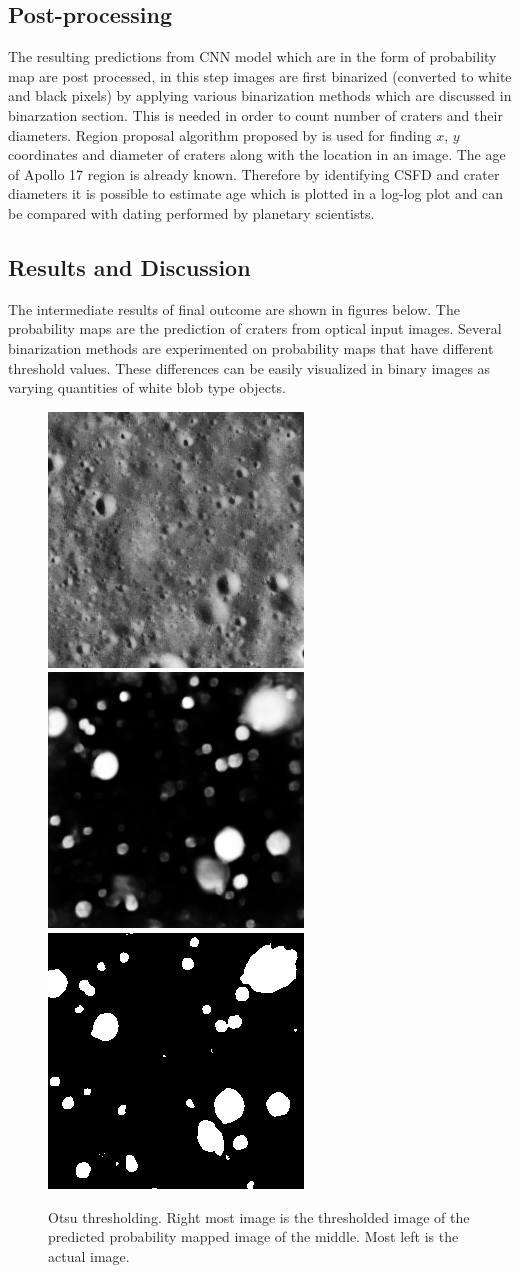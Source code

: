 \documentclass[11pt]{article}
\begin{document}
\subsection{Post-processing}
The resulting predictions from CNN model which are in the form of probability map are post processed, in this step images are first binarized (converted to white and black pixels) by applying various binarization methods which are discussed in binarzation section. This is needed in order to count number of craters and their diameters. Region proposal algorithm proposed by \cite{burger2009principles} is used for finding $x$, $y$ coordinates and diameter of craters along with the location in an image. The age of Apollo 17 region is already known. Therefore by identifying CSFD and crater diameters it is possible to estimate age which is plotted in a log-log plot and can be compared with dating performed by planetary scientists.

\subsection{Results and Discussion}
The intermediate results of final outcome are shown in figures below. The probability maps are the prediction of craters from optical input images. Several binarization methods are experimented on probability maps that have different threshold values. These differences can be easily visualized in binary images as varying quantities of white blob type objects.  

\begin{figure}[H]
	\includegraphics[width=.3\textwidth]{files/results/26.png}\hfill
	\includegraphics[width=.3\textwidth]{files/results/26_predict.png}\hfill
	\includegraphics[width=.3\textwidth]{files/results/otsu.png}
	\caption{Otsu thresholding. Right most image is the thresholded image of the predicted probability mapped image of the middle. Most left is the actual image.}
	\label{otsu thresholding}
\end{figure}
\end{document}
